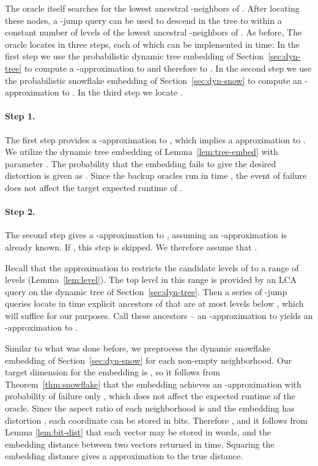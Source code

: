 \documentclass[11pt]{article}
\begin{document}
The oracle itself searches for the lowest ancestral -neighbors  of . After
locating these nodes, a -jump query can be used to descend in the tree to within a
constant number of levels of the lowest ancestral -neighbors of . As before, The
oracle locates  in three steps, each of which can be implemented in  time: In
the first step we use the probabilistic dynamic tree embedding of Section~\ref{sec:dyn-tree}
to compute a -approximation to  and therefore to . In the second
step we use the probabilistic snowflake embedding of Section~\ref{sec:dyn-snow} to compute
an -approximation to . In the third step we locate .


\paragraph{Step 1.}
The first step provides a -approximation to , which implies a 
approximation to . We utilize the dynamic tree embedding of
Lemma~\ref{lem:tree-embed} with parameter . The probability that the
embedding fails to give the desired distortion  is given as . Since the
backup oracles
run in time , the event of failure does not affect the target expected runtime of
.


\paragraph{Step 2.}
The second step gives a -approximation to , assuming an
-approximation is already known. If , this step is skipped.
We therefore assume that .

Recall that the  approximation to  restricts the candidate levels of
 to a range of  levels (Lemma~\ref{lem:level}). The top level in this range
is provided by an LCA query on the dynamic tree of Section~\ref{sec:dyn-tree}.
Then a series of -jump queries locate in  time
explicit ancestors of  that are at most  levels below , which will
suffice for our purposes. Call these ancestors  -- an -approximation to
 yields an -approximation to .

Similar to what was done before, we preprocess the dynamic snowflake embedding of
Section~\ref{sec:dyn-snow} for each non-empty neighborhood. Our target dimension for the
embedding is , so it follows from Theorem~\ref{thm:snowflake} that the
embedding achieves an -approximation with probability of failure only ,
which does not affect the expected  runtime of the oracle. Since the aspect ratio of
each neighborhood is  and the embedding has distortion , each
coordinate can be stored in  bits. Therefore , and it
follows from Lemma \ref{lem:bit-dist} that each vector may be stored in  words, and
the embedding distance between two vectors returned in  time. Squaring the embedding
distance gives a  approximation to the true distance.
\end{document}
